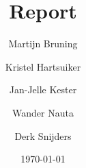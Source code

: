 \documentclass[twoside,openright]{report}
\title{Report}
\author{
     Martijn Bruning
\and Kristel Hartsuiker
\and Jan-Jelle Kester
\and Wander Nauta
\and Derk Snijders
}
\date{\today}
\begin{document}
\renewcommand*\rmdefault{ppl}
\renewcommand*\sfdefault{ppl}

\begin{titlepage}
	{\Huge \thetitle} \\
	\vfill
	\theauthor \\
	\thedate
\end{titlepage}

\tableofcontents





















\begin{thebibliography}{999}

\end{thebibliography}

\printindex

\printglossaries
\end{document}
